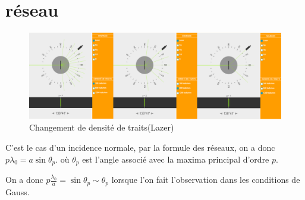 \documentclass[a4paper,12pt]{book}
\begin{document}
\renewcommand{\labelitemi}{$\blacktriangleright$}
\renewcommand{\labelitemii}{$\bullet$}


\section{réseau}
\begin{figure}[h]
    \begin{center}
    \includegraphics[scale=0.5]{tr131.png}
    \end{center}
    \caption{Changement de densité de traits(Lazer)}
\end{figure}
C'est le cas d'un incidence normale, par la formule des réseaux, on a donc $p\lambda_0=a\sin\theta_p$.
où $\theta_p$ est l'angle associé avec la maxima principal d'ordre $p$. 

On a donc $\boxed{p\frac{\lambda_0}{a}=\sin \theta_p \sim \theta_p}$ lorsque l'on fait l'observation dans les conditions de Gauss. 
\end{document}
